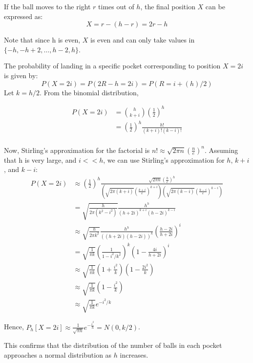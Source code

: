 \documentclass[a4paper,answers]{exam}
\begin{document}
\begin{questions}
\begin{solution}
If the ball moves to the right \( r \) times out of \( h \), the final position \( X \) can be expressed as:
\[
X = r - (h-r) = 2r-h
\]

Note that since h is even, \( X \) is even and can only take values in \( \{-h, -h+2, \dots, h-2, h\} \).

The probability of landing in a specific pocket corresponding to position \( X = 2i \) is given by:
\[
P(X = 2i) = P(2R-h = 2i) = P(R = i + (h)/2)
\]
Let \( k = h/2 \). From the binomial distribution,

\begin{align*}
P(X = 2i) &= \binom{h}{k+i} \left( \frac{1}{2} \right)^h\\
&= \left( \frac{1}{2} \right)^h \frac{h!}{(k+i)! (k-i)!}\\
\end{align*}

Now, Stirling's approximation for the factorial is $n! \approx \sqrt{2\pi n} \left(\frac{n}{e}\right)^n$.
Assuming that h is very large, and $i<<h$, we can use Stirling's approximation for \( h \), \( k+i \), and \( k-i \):
\begin{align*}
P(X = 2i) &\approx(\frac{1}{2})^h \frac{\sqrt{2\pi h} (\frac{h}{e})^h}{\left(\sqrt{2\pi (k+i)} \left(\frac{k+i}{e}\right)^{k+i}\right)\left(\sqrt{2\pi (k-i)} \left(\frac{k-i}{e}\right)^{k-i}\right)}\\
&= \sqrt{\frac{h}{2\pi (k^2-i^2)}} \frac{h^h}{(h+2i)^{k+i} (h-2i)^{k-i}}\\
&\approx \sqrt{\frac{h}{2 \pi k^2}} \frac{h^h}{{((h+2i)(h-2i))}^{k}} {(\frac{h-2i}{h+2i})}^i\\
&= \sqrt{\frac{1}{\pi k}} {(\frac{1}{1-i^2/k^2})}^{k} {(1- \frac{4i}{h+2i})}^i\\
&\approx \sqrt{\frac{1}{\pi k}} (1+\frac{i^2}{k}) (1- \frac{2i^2}{k})\\
&\approx \sqrt{\frac{1}{\pi k}} (1-\frac{i^2}{k})\\
&\approx \sqrt{\frac{1}{\pi k}} e^{-i^2/k}
\end{align*}

Hence, $P_h[X = 2i] \approx \frac{1}{\sqrt{\pi h}} e^{-\frac{i^2}{h}}= N(0, k/2)$.

This confirms that the distribution of the number of balls in each pocket approaches a normal distribution as \( h \) increases.

\end{solution}

\end{questions}
\end{document}

